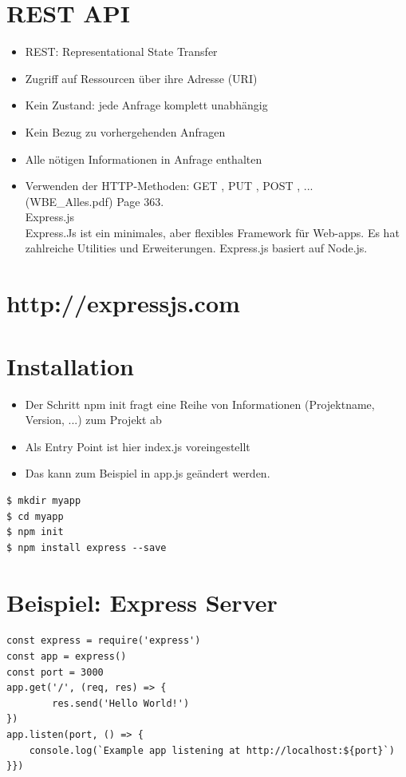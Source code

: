 \section*{REST API}
\begin{itemize}
  \item REST: Representational State Transfer
  \item Zugriff auf Ressourcen über ihre Adresse (URI)
  \item Kein Zustand: jede Anfrage komplett unabhängig
  \item Kein Bezug zu vorhergehenden Anfragen
  \item Alle nötigen Informationen in Anfrage enthalten
  \item Verwenden der HTTP-Methoden: GET , PUT , POST , ...\\
(WBE\_Alles.pdf) Page 363.\\
Express.js\\
Express.Js ist ein minimales, aber flexibles Framework für Web-apps. Es hat zahlreiche Utilities und Erweiterungen. Express.js basiert auf Node.js.
\end{itemize}

\section*{http://expressjs.com}
\section*{Installation}
\begin{itemize}
  \item Der Schritt npm init fragt eine Reihe von Informationen (Projektname, Version, ...) zum Projekt ab
  \item Als Entry Point ist hier index.js voreingestellt
  \item Das kann zum Beispiel in app.js geändert werden.
\end{itemize}

\begin{verbatim}
$ mkdir myapp
$ cd myapp
$ npm init
$ npm install express --save
\end{verbatim}

\section*{Beispiel: Express Server}
\begin{verbatim}
const express = require('express')
const app = express()
const port = 3000
app.get('/', (req, res) => {
        res.send('Hello World!')
})
app.listen(port, () => {
    console.log(`Example app listening at http://localhost:${port}`)
}})
\end{verbatim}

